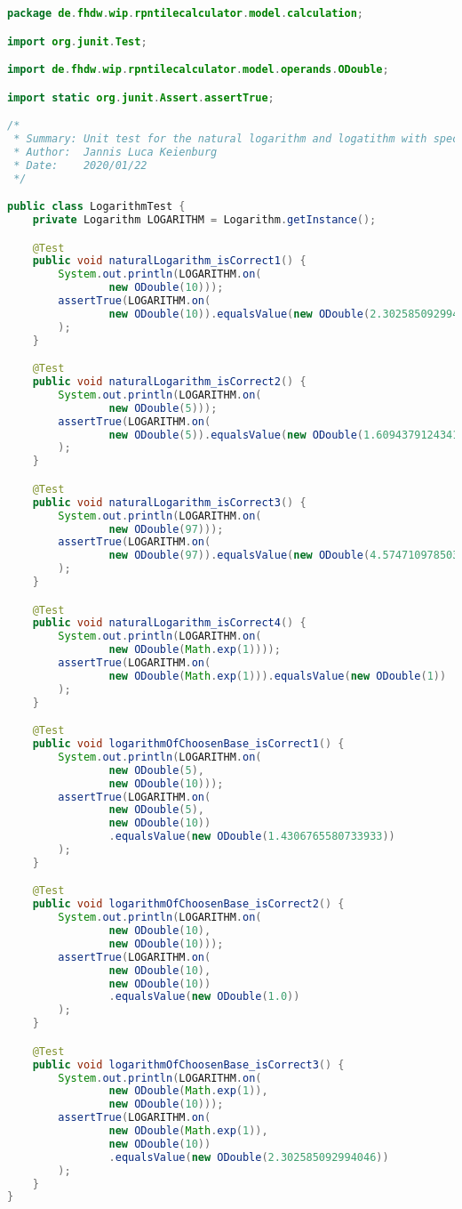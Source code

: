 \begin{lstlisting}[caption=LogarithmTest (Keienburg),label=list:LogarithmTest,language=Java]
package de.fhdw.wip.rpntilecalculator.model.calculation;

import org.junit.Test;

import de.fhdw.wip.rpntilecalculator.model.operands.ODouble;

import static org.junit.Assert.assertTrue;

/*
 * Summary: Unit test for the natural logarithm and logatithm with specific base
 * Author:  Jannis Luca Keienburg
 * Date:    2020/01/22
 */

public class LogarithmTest {
    private Logarithm LOGARITHM = Logarithm.getInstance();

    @Test
    public void naturalLogarithm_isCorrect1() {
        System.out.println(LOGARITHM.on(
                new ODouble(10)));
        assertTrue(LOGARITHM.on(
                new ODouble(10)).equalsValue(new ODouble(2.302585092994046))
        );
    }

    @Test
    public void naturalLogarithm_isCorrect2() {
        System.out.println(LOGARITHM.on(
                new ODouble(5)));
        assertTrue(LOGARITHM.on(
                new ODouble(5)).equalsValue(new ODouble(1.6094379124341003))
        );
    }

    @Test
    public void naturalLogarithm_isCorrect3() {
        System.out.println(LOGARITHM.on(
                new ODouble(97)));
        assertTrue(LOGARITHM.on(
                new ODouble(97)).equalsValue(new ODouble(4.574710978503383))
        );
    }

    @Test
    public void naturalLogarithm_isCorrect4() {
        System.out.println(LOGARITHM.on(
                new ODouble(Math.exp(1))));
        assertTrue(LOGARITHM.on(
                new ODouble(Math.exp(1))).equalsValue(new ODouble(1))
        );
    }

    @Test
    public void logarithmOfChoosenBase_isCorrect1() {
        System.out.println(LOGARITHM.on(
                new ODouble(5),
                new ODouble(10)));
        assertTrue(LOGARITHM.on(
                new ODouble(5),
                new ODouble(10))
                .equalsValue(new ODouble(1.4306765580733933))
        );
    }

    @Test
    public void logarithmOfChoosenBase_isCorrect2() {
        System.out.println(LOGARITHM.on(
                new ODouble(10),
                new ODouble(10)));
        assertTrue(LOGARITHM.on(
                new ODouble(10),
                new ODouble(10))
                .equalsValue(new ODouble(1.0))
        );
    }

    @Test
    public void logarithmOfChoosenBase_isCorrect3() {
        System.out.println(LOGARITHM.on(
                new ODouble(Math.exp(1)),
                new ODouble(10)));
        assertTrue(LOGARITHM.on(
                new ODouble(Math.exp(1)),
                new ODouble(10))
                .equalsValue(new ODouble(2.302585092994046))
        );
    }
}
\end{lstlisting} 


